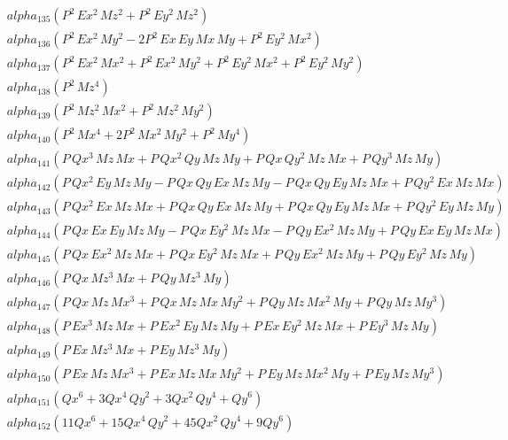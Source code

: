 \documentclass{article}
\begin{document}
\begin{align*}
  &\quad alpha_{135} \left(P^{2}\,Ex^{2}\,Mz^{2} + P^{2}\,Ey^{2}\,Mz^{2}\right) \\
  &\quad alpha_{136} \left(P^{2}\,Ex^{2}\,My^{2} - 2P^{2}\,Ex\,Ey\,Mx\,My + P^{2}\,Ey^{2}\,Mx^{2}\right) \\
  &\quad alpha_{137} \left(P^{2}\,Ex^{2}\,Mx^{2} + P^{2}\,Ex^{2}\,My^{2} + P^{2}\,Ey^{2}\,Mx^{2} + P^{2}\,Ey^{2}\,My^{2}\right) \\
  &\quad alpha_{138} \left(P^{2}\,Mz^{4}\right) \\
  &\quad alpha_{139} \left(P^{2}\,Mz^{2}\,Mx^{2} + P^{2}\,Mz^{2}\,My^{2}\right) \\
  &\quad alpha_{140} \left(P^{2}\,Mx^{4} + 2P^{2}\,Mx^{2}\,My^{2} + P^{2}\,My^{4}\right) \\
  &\quad alpha_{141} \left(P\,Qx^{3}\,Mz\,Mx + P\,Qx^{2}\,Qy\,Mz\,My + P\,Qx\,Qy^{2}\,Mz\,Mx + P\,Qy^{3}\,Mz\,My\right) \\
  &\quad alpha_{142} \left(P\,Qx^{2}\,Ey\,Mz\,My -P\,Qx\,Qy\,Ex\,Mz\,My -P\,Qx\,Qy\,Ey\,Mz\,Mx + P\,Qy^{2}\,Ex\,Mz\,Mx\right) \\
  &\quad alpha_{143} \left(P\,Qx^{2}\,Ex\,Mz\,Mx + P\,Qx\,Qy\,Ex\,Mz\,My + P\,Qx\,Qy\,Ey\,Mz\,Mx + P\,Qy^{2}\,Ey\,Mz\,My\right) \\
  &\quad alpha_{144} \left(P\,Qx\,Ex\,Ey\,Mz\,My -P\,Qx\,Ey^{2}\,Mz\,Mx -P\,Qy\,Ex^{2}\,Mz\,My + P\,Qy\,Ex\,Ey\,Mz\,Mx\right) \\
  &\quad alpha_{145} \left(P\,Qx\,Ex^{2}\,Mz\,Mx + P\,Qx\,Ey^{2}\,Mz\,Mx + P\,Qy\,Ex^{2}\,Mz\,My + P\,Qy\,Ey^{2}\,Mz\,My\right) \\
  &\quad alpha_{146} \left(P\,Qx\,Mz^{3}\,Mx + P\,Qy\,Mz^{3}\,My\right) \\
  &\quad alpha_{147} \left(P\,Qx\,Mz\,Mx^{3} + P\,Qx\,Mz\,Mx\,My^{2} + P\,Qy\,Mz\,Mx^{2}\,My + P\,Qy\,Mz\,My^{3}\right) \\
  &\quad alpha_{148} \left(P\,Ex^{3}\,Mz\,Mx + P\,Ex^{2}\,Ey\,Mz\,My + P\,Ex\,Ey^{2}\,Mz\,Mx + P\,Ey^{3}\,Mz\,My\right) \\
  &\quad alpha_{149} \left(P\,Ex\,Mz^{3}\,Mx + P\,Ey\,Mz^{3}\,My\right) \\
  &\quad alpha_{150} \left(P\,Ex\,Mz\,Mx^{3} + P\,Ex\,Mz\,Mx\,My^{2} + P\,Ey\,Mz\,Mx^{2}\,My + P\,Ey\,Mz\,My^{3}\right) \\
  &\quad alpha_{151} \left(Qx^{6} + 3Qx^{4}\,Qy^{2} + 3Qx^{2}\,Qy^{4} + Qy^{6}\right) \\
  &\quad alpha_{152} \left(11Qx^{6} + 15Qx^{4}\,Qy^{2} + 45Qx^{2}\,Qy^{4} + 9Qy^{6}\right) \\

\end{align*}
\end{document}
